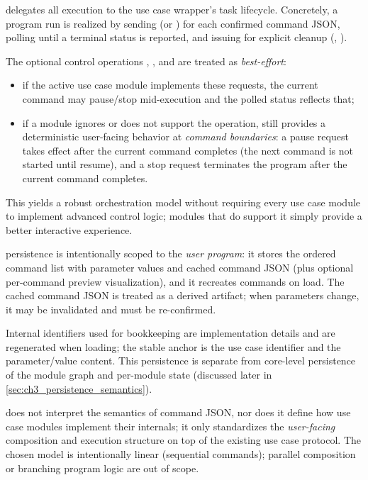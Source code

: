  delegates all execution to the use case wrapper's task lifecycle. Concretely, a program run is realized by sending  (or ) for each confirmed command JSON, polling  until a terminal status is reported, and issuing  for explicit cleanup (, ). 

The optional control operations , , and  are treated as \emph{best-effort}:
\begin{itemize}
    \item if the active use case module implements these requests, the current command may pause/stop mid-execution and the polled status reflects that;
    \item if a module ignores or does not support the operation,  still provides a deterministic user-facing behavior at \emph{command boundaries}: a pause request takes effect after the current command completes (the next command is not started until resume), and a stop request terminates the program after the current command completes.
\end{itemize}
This yields a robust orchestration model without requiring every use case module to implement advanced control logic; modules that do support it simply provide a better interactive experience.


 persistence is intentionally scoped to the \emph{user program}: it stores the ordered command list with parameter values and cached command JSON (plus optional per-command preview visualization), and it recreates commands on load. The cached command JSON is treated as a derived artifact; when parameters change, it may be invalidated and must be re-confirmed.

Internal identifiers used for bookkeeping are implementation details and are regenerated when loading; the stable anchor is the use case identifier and the parameter/value content. This persistence is separate from core-level persistence of the module graph and per-module state (discussed later in \autoref{sec:ch3_persistence_semantics}).

 does not interpret the semantics of command JSON, nor does it define how use case modules implement their internals; it only standardizes the \emph{user-facing} composition and execution structure on top of the existing use case protocol. The chosen model is intentionally linear (sequential commands); parallel composition or branching program logic are out of scope.



